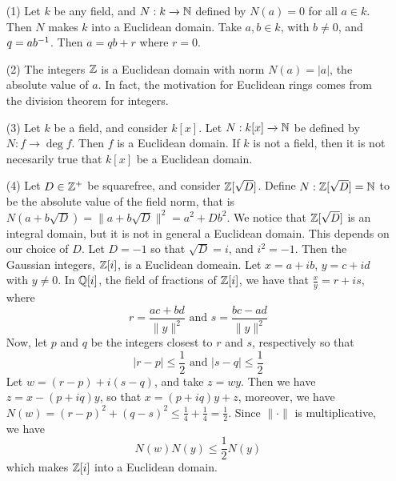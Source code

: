 \begin{example}\label{example_6.1}
  \begin{enumerate}
    \item[(1)] Let $k$ be any field, and  $N:k \xrightarrow{} \mathbb{N}$ defined by
      $N(a)=0$ for all $a \in k$. Then  $N$ makes  $k$ into a Euclidean
      domain. Take  $a,b \in k$, with  $b \neq 0$, and  $q=ab^{-1}$. Then
      $a=qb+r$ where  $r=0$.

    \item[(2)] The integers $\mathbb{Z}$ is a Euclidean domain with norm $N(a)=|a|$,
      the absolute value of $a$. In fact, the motivation for Euclidean
      rings comes from the division theorem for integers.

    \item[(3)] Let $k$ be a field, and consider  $k[x]$. Let $N:k[x]
      \xrightarrow{} \mathbb{N}$ be defined by $N:f \xrightarrow{} \deg{f}$. Then
      $f$ is a Euclidean domain. If  $k$ is not a field, then it is not
      necesarily true that $k[x]$ be a Euclidean domain.

    \item[(4)] Let $D \in \mathbb{Z}^+$ be squarefree, and consider  $\mathbb{Z}[\sqrt{D}]$.
      Define $N:\mathbb{Z}[\sqrt{D}]=\mathbb{N}$ to be the absolute value of the field
      norm, that is $N(a+b\sqrt{D})=\|a+b\sqrt{D}\|^2=a^2+Db^2$. We notice
      that $\mathbb{Z}[\sqrt{D}]$ is an integral domain, but it is not in
      general a Euclidean domain. This depends on our choice of $D$.
      Let  $D=-1$ so that $\sqrt{D}=i$, and $i^2=-1$. Then the Gaussian
      integers, $\mathbb{Z}[i]$, is a Euclidean domeain. Let $x=a+ib$,
      $y=c+id$ with  $y \neq 0$. In $\mathbb{Q}[i]$, the field of fractions of
      $\mathbb{Z}[i]$, we have that $\frac{x}{y}=r+is$, where
      \begin{equation*}
        r=\frac{ac+bd}{\|y\|^2} \text{ and } s=\frac{bc-ad}{\|y\|^2}
      \end{equation*}
      Now, let $p$ and  $q$ be the integers closest to $r$ and $s$,
      respectively so that
      \begin{equation*}
        |r-p| \leq \frac{1}{2} \text{ and } |s-q| \leq \frac{1}{2}
      \end{equation*}
      Let $w=(r-p)+i(s-q)$, and take $z=wy$. Then we have  $z=x-(p+iq)y$,
      so that $x=(p+iq)y+z$, moreover, we have $N(w)=(r-p)^2+(q-s)^2 \leq
      \frac{1}{4}+\frac{1}{4}=\frac{1}{2}$. Since $\|\cdot\|$ is
      multiplicative, we have
      \begin{equation*}
        N(w)N(y) \leq \frac{1}{2}N(y)
      \end{equation*}
      which makes $\mathbb{Z}[i]$ into a Euclidean domain.


\end{enumerate}
\end{example}
